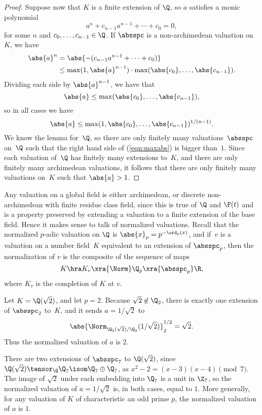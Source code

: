 \documentclass[11pt]{book}
\begin{document}
\begin{ch}
\begin{proof}
Suppose now that $K$ is a finite extension of $\Q$, so
$a$ satisfies a monic polynomial
$$
  a^n + c_{n-1} a^{n-1} + \cdots + c_0 = 0,
$$
for some $n$ and $c_0,\ldots, c_{n-1}\in\Q$.
If $\absspc$ is a non-archimedean valuation on $K$, we have
\begin{align*}
  \abs{a}^n &= \abs{-(c_{n-1} a^{n-1} + \cdots + c_0)} \\
      &\leq \max(1,\abs{a}^{n-1})\cdot \max(\abs{c_0},\ldots,\abs{c_{n-1}}).
\end{align*}
Dividing each side by $\abs{a}^{n-1}$, we have
that
$$
   \abs{a} \leq \max(\abs{c_0},\ldots,\abs{c_{n-1}}),
$$
so in all cases we have
\begin{equation}\label{eqn:maxabs}
   \abs{a} \leq \max(1, \abs{c_0},
   \ldots,\abs{c_{n-1}})^{1/(n-1)}.
\end{equation}
We know the lemma for~$\Q$, so there are only finitely many
valuations~$\absspc$ on~$\Q$ such that the right hand side of
(\ref{eqn:maxabs}) is bigger than~$1$.  Since each valuation of~$\Q$
has finitely many extensions to~$K$, and there are only finitely many
archimedean valuations, it follows that there are only finitely many
valuations on~$K$ such that $\abs{a}>1$.
\end{proof}

Any valuation on a global field is either archimedean, or discrete
non-archimedean with finite residue class field, since this is true of
$\Q$ and $\F(t)$ and is a property preserved by extending a valuation
to a finite extension of the base field.  Hence it makes sense to talk
of normalized valuations.  Recall that the normalized $p$-adic
valuation on $\Q$ is $\abs{x}_p = p^{-\ord_p(x)}$, and if~$v$ is a
valuation on a number field~$K$ equivalent to an extension of
$\absspc_p$, then the normalization of $v$ is the composite of the
sequence of maps
$$
  K\hra K_v \xra{\Norm} \Q_p \xra{\absspc_p} \R,
$$
where $K_v$ is the completion of $K$ at $v$.

\begin{example}
Let $K=\Q(\sqrt{2})$, and let $p=2$.  Because $\sqrt{2}\not\in\Q_2$, there is
exactly one extension of $\absspc_2$ to~$K$, and
it sends $a=1/\sqrt{2}$ to
$$
  \abs{\Norm_{\Q_2(\sqrt{2})/\Q_2}(1/\sqrt{2})}^{1/2}_2 = \sqrt{2}.
$$
Thus the normalized valuation of $a$ is $2$.

There are two extensions of $\absspc_7$ to $\Q(\sqrt{2})$,
since $\Q(\sqrt{2})\tensor_\Q \Q_7 \isom \Q_7 \oplus \Q_7$,
as $x^2-2 = (x-3)(x-4)\pmod{7}$.  The image of $\sqrt{2}$
under each embedding into $\Q_7$ is a unit in $\Z_7$, so
the normalized valuation of $a=1/\sqrt{2}$ is, in both
cases, equal to $1$.  More generally, for any valuation
of $K$ of characteristic an odd prime $p$, the
normalized valuation of $a$ is $1$.


\end{example}
\end{ch}
\end{document}
